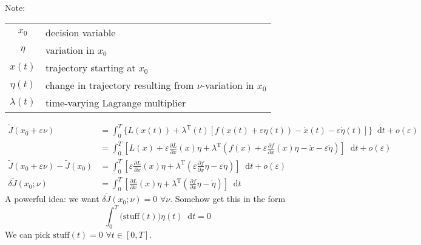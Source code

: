 \documentclass[letterpaper,12pt,titlepage]{report}
\newcommand*\dif{\mathop{}\!\mathrm{d}}
\newcommand{\trans}{^\text{T}}
\newcommand*\pder[2]{\frac{\partial #1}{\partial #2}}
\theoremstyle{plain}
\theoremstyle{definition}
\begin{document}
\begin{center}
\end{center}

Note:

\hspace{\parindent}
\begin{tabular}{cl}
  $x_0$ & decision variable \\
  $\eta$ & variation in $x_0$ \\
  $x(t)$ & trajectory starting at $x_0$ \\
  $\eta(t)$ & change in trajectory resulting from $\nu$-variation in $x_0$ \\
  $\lambda(t)$ & time-varying Lagrange multiplier
\end{tabular}

\begin{align}
  \tilde J(x_0+\varepsilon \nu) &= \int_0^T \Big\{ L(x(t)) + \lambda\trans(t) [f(x(t)+\varepsilon\eta(t)) - \dot x(t) - \varepsilon\dot\eta(t)] \Big\} \dif t + o(\varepsilon) \\
                                &= \int_0^T \left[ L(x) + \varepsilon\pder{L}{x}(x)\eta + \lambda\trans \left( f(x) + \varepsilon\pder{f}{x}(x)\eta - \dot x - \varepsilon\dot\eta \right) \right] \dif t + o(\varepsilon) \\
  \tilde J(x_0+\varepsilon \nu) - \tilde J(x_0) &= \int_0^T \left[ \varepsilon\pder{L}{x}(x)\eta + \lambda\trans\left( \varepsilon\pder{f}{x}\eta - \varepsilon\dot\eta \right) \right] \dif t + o(\varepsilon) \\
  \delta \tilde J (x_0;\nu) &= \int_0^T \left[ \pder{L}{x}(x)\eta + \lambda\trans\left( \pder{f}{x}\eta - \dot\eta \right) \right] \dif t
\end{align}
A powerful idea: we want $\delta\tilde J(x_0;\nu)=0$ $\forall \nu$. Somehow get this in the form
\[ \int_0^T \Big(\text{stuff}(t)\Big) \eta(t) \dif t = 0 \]
We can pick $\text{stuff}(t)=0$ $\forall t\in[0,T]$.
\end{document}
